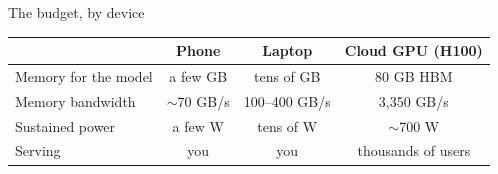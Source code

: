 \begin{frame}{The budget, by device}
  \vspace{0.6em}
  \centering
  \begin{tabular}{@{}lccc@{}}
    \toprule
    & \textbf{Phone} & \textbf{Laptop} & \textbf{Cloud GPU (H100)}\\
    \midrule
    Memory for the model & a few GB & tens of GB & 80 GB HBM\\
    Memory bandwidth & $\sim$70 GB/s & 100--400 GB/s & 3{,}350 GB/s\\
    Sustained power & a few W & tens of W & $\sim$700 W\\
    Serving & you & you & thousands of users\\
    \bottomrule
  \end{tabular}

  \vspace{0.9em}
\end{frame}

